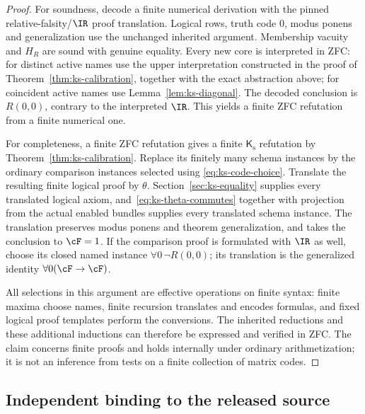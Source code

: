 \begin{proof}
For soundness, decode a finite numerical derivation with the pinned
relative-falsity/$\IR$ proof translation.  Logical rows, truth code $0$,
modus ponens and generalization use the unchanged inherited argument.
Membership vacuity and $H_R$ are sound with genuine equality.  Every
new core is interpreted in ZFC: for distinct active names use the upper
interpretation constructed in the proof of
Theorem~\ref{thm:ks-calibration}, together with the exact abstraction above; for
coincident active names use Lemma~\ref{lem:ks-diagonal}.  The decoded
conclusion is $R(0,0)$, contrary to the interpreted $\IR$.
This yields a finite ZFC refutation from a finite numerical one.

For completeness, a finite ZFC refutation gives a finite
$\mathsf K_{\mathrm s}$ refutation by
Theorem~\ref{thm:ks-calibration}.  Replace its finitely many schema
instances by the ordinary comparison instances selected using
\eqref{eq:ks-code-choice}.  Translate the resulting finite logical
proof by $\theta$.  Section~\ref{sec:ks-equality} supplies every
translated logical axiom, and~\eqref{eq:ks-theta-commutes} together with
projection from the actual enabled bundles supplies every translated
schema instance.  The translation preserves modus ponens and theorem
generalization, and takes the conclusion to $\cF=1$.
If the comparison proof is formulated with $\IR$ as well, choose its
closed named instance $\forall0\,\neg R(0,0)$; its translation is the
generalized identity $\forall0(\cF\to\cF)$.

All selections in this argument are effective operations on finite
syntax: finite maxima choose names, finite recursion translates and
encodes formulas, and fixed logical proof templates perform the
conversions.  The inherited reductions and these additional inductions
can therefore be expressed and verified in ZFC.  The claim concerns
finite proofs and holds internally under ordinary arithmetization; it
is not an inference from tests on a finite collection of matrix codes.
\end{proof}

\subsection{Independent binding to the released source}
\label{sec:ks-emitter-binding}

